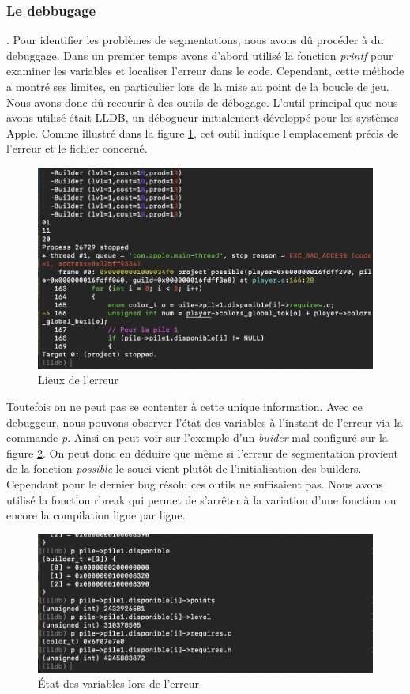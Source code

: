 \documentclass{article}
\begin{document}
\subsubsection{Le debbugage}

\vspace{1em}

 

\hspace{1em}. Pour identifier les problèmes de segmentations, nous avons dû procéder à du debuggage. Dans un premier temps avons d'abord utilisé la fonction \emph{printf}  pour examiner les variables et localiser l'erreur dans le code. Cependant, cette méthode a montré ses limites, en particulier lors de la mise au point de la boucle de jeu. Nous avons donc dû recourir à des outils de débogage. L'outil principal que nous avons utilisé était LLDB, un débogueur initialement développé pour les systèmes Apple. Comme illustré dans la figure \ref{fig:lieux erreur}, cet outil indique l'emplacement précis de l'erreur et le fichier concerné.



\begin{figure}[ht]
    \centering
    \includegraphics[width=0.5\linewidth]{Lieux erreur.png}
    \caption{Lieux de l'erreur}
    \label{fig:lieux erreur}
\end{figure}

Toutefois on ne peut pas se contenter à cette unique information. Avec ce debuggeur, nous pouvons observer l'état des variables à l'instant de l'erreur via la commande \emph{p}. Ainsi on peut voir sur l'exemple d'un \emph{buider} mal configuré sur la figure \ref{fig:print lldb}. On peut donc en déduire que même si l'erreur de segmentation provient de la fonction \emph{possible} le souci vient plutôt de l'initialisation des builders. Cependant pour le dernier bug résolu ces outils ne suffisaient pas. Nous avons utilisé la fonction rbreak qui permet de s'arrêter à la variation d'une fonction ou encore la compilation ligne par ligne. 


\begin{figure}[ht]
    \centering
    \includegraphics[width = 0.5 \linewidth]{printlldb.png}
    \caption{État des variables lors de l'erreur}
    \label{fig:print lldb}
\end{figure}
\end{document}
